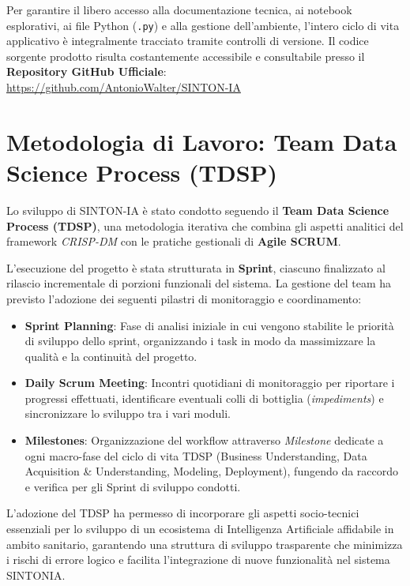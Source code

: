 Per garantire il libero accesso alla documentazione tecnica, ai notebook esplorativi, ai file Python (\texttt{.py}) e alla gestione dell'ambiente, l'intero ciclo di vita applicativo è integralmente tracciato tramite controlli di versione. Il codice sorgente prodotto risulta costantemente accessibile e consultabile presso il \textbf{Repository GitHub Ufficiale}: \\ \url{https://github.com/AntonioWalter/SINTON-IA}

\clearpage
\section{Metodologia di Lavoro: Team Data Science Process (TDSP)}
\label{sec:metodologia_tdsp}

Lo sviluppo di SINTON-IA è stato condotto seguendo il \textbf{Team Data Science Process (TDSP)}, una metodologia iterativa che combina gli aspetti analitici del framework \textit{CRISP-DM} con le pratiche gestionali di \textbf{Agile SCRUM}.

L'esecuzione del progetto è stata strutturata in \textbf{Sprint}, ciascuno finalizzato al rilascio incrementale di porzioni funzionali del sistema. La gestione del team ha previsto l'adozione dei seguenti pilastri di monitoraggio e coordinamento:
\begin{itemize}
    \item \textbf{Sprint Planning}: Fase di analisi iniziale in cui vengono stabilite le priorità di sviluppo dello sprint, organizzando i task in modo da massimizzare la qualità e la continuità del progetto.
    \item \textbf{Daily Scrum Meeting}: Incontri quotidiani di monitoraggio per riportare i progressi effettuati, identificare eventuali colli di bottiglia (\textit{impediments}) e sincronizzare lo sviluppo tra i vari moduli.
    \item \textbf{Milestones}: Organizzazione del workflow attraverso \textit{Milestone} dedicate a ogni macro-fase del ciclo di vita TDSP (Business Understanding, Data Acquisition \& Understanding, Modeling, Deployment), fungendo da raccordo e verifica per gli Sprint di sviluppo condotti.
\end{itemize}

L'adozione del TDSP ha permesso di incorporare gli aspetti socio-tecnici essenziali per lo sviluppo di un ecosistema di Intelligenza Artificiale affidabile in ambito sanitario, garantendo una struttura di sviluppo trasparente che minimizza i rischi di errore logico e facilita l'integrazione di nuove funzionalità nel sistema SINTONIA.


